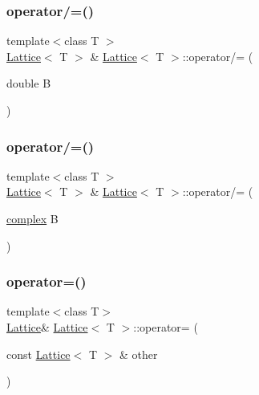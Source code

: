 \mbox{\label{class_lattice_aafe786fd40986031094f2d76ca28640b}} 
\subsubsection{\texorpdfstring{operator/=()}{operator/=()}\hspace{0.1cm}{\footnotesize\ttfamily [1/2]}}
{\footnotesize\ttfamily template$<$class T $>$ \\
\mbox{\hyperlink{class_lattice}{Lattice}}$<$ T $>$ \& \mbox{\hyperlink{class_lattice}{Lattice}}$<$ T $>$\+::operator/= (\begin{DoxyParamCaption}\item[{double}]{B }\end{DoxyParamCaption})\hspace{0.3cm}{\ttfamily [inline]}}

\mbox{\label{class_lattice_afa9568877b23d2266c7d2f29fe0ec6ad}} 
\subsubsection{\texorpdfstring{operator/=()}{operator/=()}\hspace{0.1cm}{\footnotesize\ttfamily [2/2]}}
{\footnotesize\ttfamily template$<$class T $>$ \\
\mbox{\hyperlink{class_lattice}{Lattice}}$<$ T $>$ \& \mbox{\hyperlink{class_lattice}{Lattice}}$<$ T $>$\+::operator/= (\begin{DoxyParamCaption}\item[{\mbox{\hyperlink{classcomplex}{complex}}}]{B }\end{DoxyParamCaption})\hspace{0.3cm}{\ttfamily [inline]}}

\mbox{\label{class_lattice_acc09c6b9abeafc6b735c3b95d8537edf}} 
\subsubsection{\texorpdfstring{operator=()}{operator=()}\hspace{0.1cm}{\footnotesize\ttfamily [1/2]}}
{\footnotesize\ttfamily template$<$class T$>$ \\
\mbox{\hyperlink{class_lattice}{Lattice}}\& \mbox{\hyperlink{class_lattice}{Lattice}}$<$ T $>$\+::operator= (\begin{DoxyParamCaption}\item[{const \mbox{\hyperlink{class_lattice}{Lattice}}$<$ T $>$ \&}]{other }\end{DoxyParamCaption})\hspace{0.3cm}{\ttfamily [inline]}}



